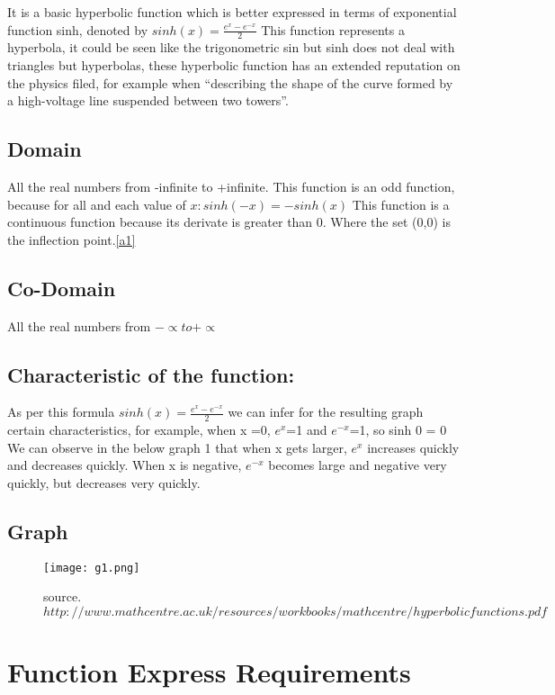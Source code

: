 \documentclass[12pt]{report}
\begin{document}
It is a basic hyperbolic function which is better expressed in terms of exponential function sinh, denoted by $sinh(x)= \frac{e^x- e^{-x}}{2}$		
This function represents a hyperbola, it could be seen like the trigonometric sin but sinh does not deal with triangles but hyperbolas, these hyperbolic function has an extended reputation on the physics filed, for example when “describing the shape of the curve formed by a high-voltage line suspended between two towers”.


\subsection{Domain}
All the real numbers from -infinite to +infinite.
This function is an odd function, because for all and each value of $ x: sinh(-x) = -sinh(x)$
This function is a continuous function because its derivate is greater than 0. Where the set (0,0) is the inflection point.\ref{a1}
\subsection{Co-Domain}
All the real numbers from $-\propto to +\propto$
\subsection{Characteristic of the function: }
As per this formula $sinh(x)= \frac{e^x- e^{-x}}{2}$ we can infer for the resulting graph certain characteristics, for example, when x =0, $e^x$=1 and $e^{-x}$=1, so sinh 0 = 0
We can observe in the below graph 1 that when x gets larger, $e^x$ increases quickly and decreases quickly. 
When x is negative, $e^{-x}$ becomes large and negative very quickly, but decreases very quickly.
\pagebreak
\subsection{Graph}
\begin{figure}[h]
    \centering
    \texttt{[image: g1.png]}
    \caption{source. $http://www.mathcentre.ac.uk/resources/workbooks/mathcentre/hyperbolicfunctions.pdf$}
    \label{fig3}
\end{figure}



\pagebreak
\renewcommand{\thesection}{\arabic{section}}
\section{Function Express Requirements}
 
\end{document}
